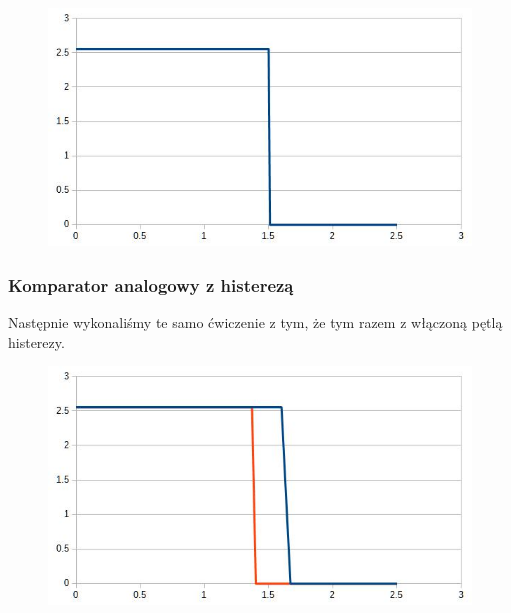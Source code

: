 \documentclass{article}
\begin{document}
\begin{figure}[h!]
	\centering
	\includegraphics[scale=0.5]{ch01}
\end{figure}
\clearpage
\subsubsection{Komparator analogowy z histerezą}
Następnie wykonaliśmy te samo ćwiczenie z tym, że tym razem z włączoną pętlą histerezy. 
\begin{figure}[h!]
	\centering
	\includegraphics[scale=0.4]{ch02}
\end{figure}
\end{document}
